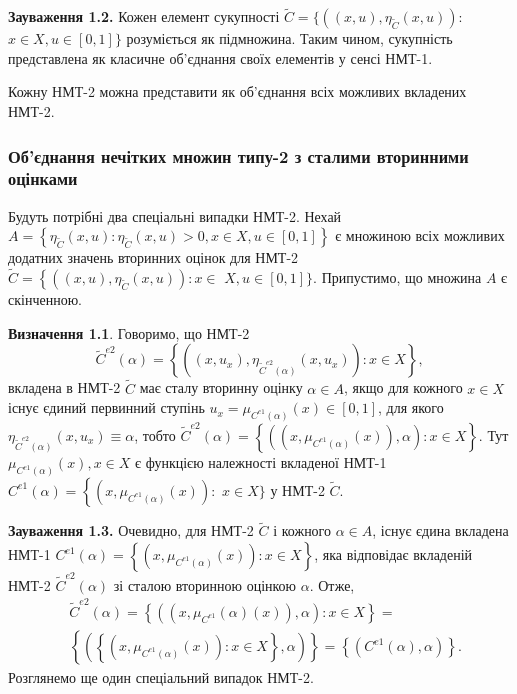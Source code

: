 \documentclass[14pt, a4paper, oneside]{extarticle}
\numberwithin{equation}{section}
\begin{document}
\textbf{Зауваження 1.2.} Кожен елемент сукупності $\tilde{C}=\{\left((x, u), \eta_{\tilde{C}}(x, u)\right):$\\$x \in X, u \in[0,1]\}$ розуміється як підмножина. Таким чином, сукупність представлена як класичне об'єднання своїх елементів у сенсі НМТ-1.

Кожну НМТ-2 можна представити як об'єднання всіх можливих вкладених НМТ-2.

\subsubsection{Об'єднання нечітких множин типу-2 з сталими вторинними оцінками}
Будуть потрібні два спеціальні випадки НМТ-2. Нехай \\$A=\left\{\eta_{\tilde{C}}(x, u): \eta_{\tilde{C}}(x, u)>0, x \in X, u \in[0,1]\right\}$ є множиною всіх можливих додатних значень вторинних оцінок для НМТ-2 $\tilde{C}=\left\{\left((x, u), \eta_{\tilde{C}}(x, u)\right): x \in\right.$ $X, u \in[0,1]\}$. Припустимо, що множина $A$ є скінченною.

\textbf{Визначення 1.1}. Говоримо, що НМТ-2
\begin{equation*}
\tilde{C}^{e 2}(\alpha)=\left\{\left(\left(x, u_{x}\right), \eta_{\tilde{C}^{e 2}(\alpha)}\left(x, u_{x}\right)\right): x \in X\right\},
\end{equation*}
вкладена в НМТ-2 $\tilde{C}$ має сталу вторинну оцінку $\alpha \in A$, якщо для кожного $x \in X$ існує єдиний первинний ступінь $u_{x}=\mu_{C^{e 1}(\alpha)}(x) \in[0,1]$, для якого $\eta_{\tilde{C}^{e 2}(\alpha)}\left(x, u_{x}\right) \equiv \alpha$, тобто $\tilde{C}^{e 2}(\alpha)=\left\{\left(\left(x, \mu_{C^{e 1}(\alpha)}(x)\right), \alpha\right): x \in X\right\}$. Тут $\mu_{C^{e 1}(\alpha)}(x), x \in X$ є функцією належності вкладеної НМТ-1 $C^{e 1}(\alpha)=\left\{\left(x, \mu_{C^{e 1}(\alpha)}(x)\right):\right.$ $x \in X\}$ у НМТ-2 $\tilde{C}$.

\textbf{Зауваження 1.3.} Очевидно, для НМТ-2 $\tilde{C}$ і кожного $\alpha \in A$, існує єдина вкладена НМТ-1 $C^{e 1}(\alpha)=\left\{\left(x, \mu_{C^{e 1}(\alpha)}(x)\right): x \in X\right\}$, яка відповідає вкладеній НМТ-2 $\tilde{C}^{e 2}(\alpha)$ зі сталою вторинною оцінкою $\alpha$. Отже,
\begin{equation*}
\begin{aligned}
& \tilde{C}^{e 2}(\alpha)=\left\{\left(\left(x, \mu_{C^{e 1}}(\alpha)(x)\right), \alpha\right): x \in X\right\}= \\
& \left\{\left(\left\{\left(x, \mu_{C^{e 1}(\alpha)}(x)\right): x \in X\right\}, \alpha\right)\right\}=\left\{\left(C^{e 1}(\alpha), \alpha\right)\right\}.
\end{aligned}
\end{equation*}
Розглянемо ще один спеціальний випадок НМТ-2.
\end{document}
